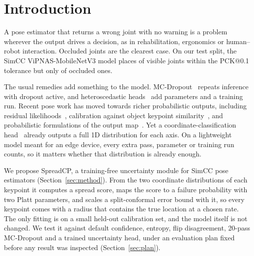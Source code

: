 \documentclass[preprint,11pt]{elsarticle}
\newcommand{\method}{SpreadCP}
\begin{document}
\section{Introduction}

A pose estimator that returns a wrong joint with no warning is a problem wherever the output
drives a decision, as in rehabilitation, ergonomics or human--robot interaction. Occluded joints
are the clearest case. On our test split, the SimCC ViPNAS-MobileNetV3 model places
\pckVis{} of visible joints within the PCK@0.1 tolerance but only \pckOcc{} of occluded ones.

The usual remedies add something to the model. MC-Dropout~\cite{gal2016dropout} repeats
inference with dropout active, and heteroscedastic heads~\cite{kendall2017uncertainties} add
parameters and a training run. Recent pose work has moved towards richer probabilistic outputs,
including residual likelihoods~\cite{li2021rle}, calibration against object keypoint
similarity~\cite{gu2024calibration}, and probabilistic formulations of the output
map~\cite{purkrabek2025probpose}. Yet a coordinate-classification head~\cite{li2022simcc}
already outputs a full 1D distribution for each axis. On a lightweight model meant for an edge
device, every extra pass, parameter or training run counts, so it matters whether that distribution
is already enough.

We propose \method{}, a training-free uncertainty module for SimCC pose estimators
(Section~\ref{sec:method}). From the two coordinate distributions of each keypoint it computes a
spread score, maps the score to a failure probability with two Platt parameters, and scales a
split-conformal error bound with it, so every keypoint comes with a radius that contains the true
location at a chosen rate. The only fitting is on a small held-out calibration set, and the model
itself is not changed. We test it against default confidence, entropy, flip disagreement, 20-pass
MC-Dropout and a trained uncertainty head, under an evaluation plan fixed before any result was
inspected (Section~\ref{sec:plan}).
\end{document}
